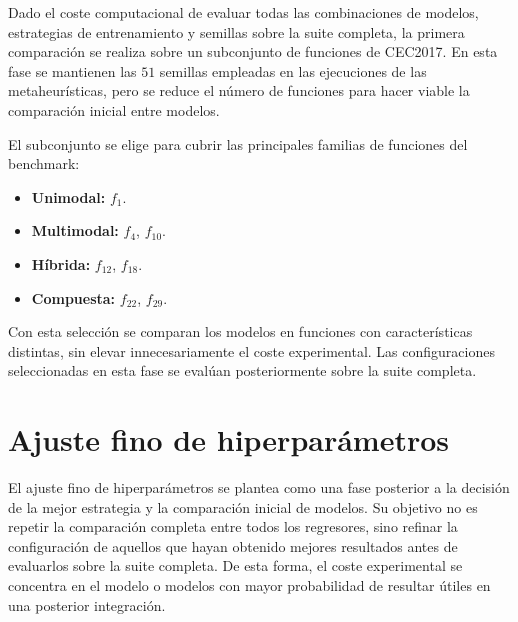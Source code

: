 Dado el coste computacional de evaluar todas las combinaciones de modelos, estrategias de entrenamiento y semillas sobre la suite completa, la primera comparación se realiza sobre un subconjunto de funciones de CEC2017. En esta fase se mantienen las \(51\) semillas empleadas en las ejecuciones de las metaheurísticas, pero se reduce el número de funciones para hacer viable la comparación inicial entre modelos.

El subconjunto se elige para cubrir las principales familias de funciones del benchmark:

\begin{itemize}
    \item \textbf{Unimodal:} \(f_1\).
    \item \textbf{Multimodal:} \(f_4\), \(f_{10}\).
    \item \textbf{Híbrida:} \(f_{12}\), \(f_{18}\).
    \item \textbf{Compuesta:} \(f_{22}\), \(f_{29}\).
\end{itemize}

Con esta selección se comparan los modelos en funciones con características distintas, sin elevar innecesariamente el coste experimental. Las configuraciones seleccionadas en esta fase se evalúan posteriormente sobre la suite completa.

\section{Ajuste fino de hiperparámetros}
\label{sec:protocolo_ajuste_hiperparametros}



El ajuste fino de hiperparámetros se plantea como una fase posterior a la decisión de la mejor estrategia y la comparación inicial de modelos. Su objetivo no es repetir la comparación completa entre todos los regresores, sino refinar la configuración de aquellos que hayan obtenido mejores resultados antes de evaluarlos sobre la suite completa. De esta forma, el coste experimental se concentra en el modelo o modelos con mayor probabilidad de resultar útiles en una posterior integración.

